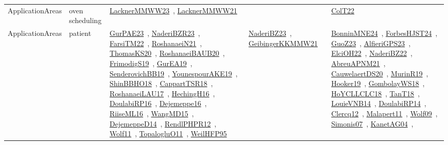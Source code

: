{\begin{longtable}{lp{3cm}>{\raggedright\arraybackslash}p{6cm}>{\raggedright\arraybackslash}p{6cm}>{\raggedright\arraybackslash}p{8cm}}
ApplicationAreas & oven scheduling & \href{../works/LacknerMMWW23.pdf}{LacknerMMWW23}~\cite{LacknerMMWW23}, \href{../works/LacknerMMWW21.pdf}{LacknerMMWW21}~\cite{LacknerMMWW21} &  & \href{../works/ColT22.pdf}{ColT22}~\cite{ColT22}\\
ApplicationAreas & patient & \href{../works/GurPAE23.pdf}{GurPAE23}~\cite{GurPAE23}, \href{../works/NaderiBZR23.pdf}{NaderiBZR23}~\cite{NaderiBZR23}, \href{../works/FarsiTM22.pdf}{FarsiTM22}~\cite{FarsiTM22}, \href{../works/RoshanaeiN21.pdf}{RoshanaeiN21}~\cite{RoshanaeiN21}, \href{../works/ThomasKS20.pdf}{ThomasKS20}~\cite{ThomasKS20}, \href{../works/RoshanaeiBAUB20.pdf}{RoshanaeiBAUB20}~\cite{RoshanaeiBAUB20}, \href{../works/FrimodigS19.pdf}{FrimodigS19}~\cite{FrimodigS19}, \href{../works/GurEA19.pdf}{GurEA19}~\cite{GurEA19}, \href{../works/SenderovichBB19.pdf}{SenderovichBB19}~\cite{SenderovichBB19}, \href{../works/YounespourAKE19.pdf}{YounespourAKE19}~\cite{YounespourAKE19}, \href{../works/ShinBBHO18.pdf}{ShinBBHO18}~\cite{ShinBBHO18}, \href{../works/CappartTSR18.pdf}{CappartTSR18}~\cite{CappartTSR18}, \href{../works/RoshanaeiLAU17.pdf}{RoshanaeiLAU17}~\cite{RoshanaeiLAU17}, \href{../works/HechingH16.pdf}{HechingH16}~\cite{HechingH16}, \href{../works/DoulabiRP16.pdf}{DoulabiRP16}~\cite{DoulabiRP16}, \href{../works/Dejemeppe16.pdf}{Dejemeppe16}~\cite{Dejemeppe16}, \href{../works/RiiseML16.pdf}{RiiseML16}~\cite{RiiseML16}, \href{../works/WangMD15.pdf}{WangMD15}~\cite{WangMD15}, \href{../works/DejemeppeD14.pdf}{DejemeppeD14}~\cite{DejemeppeD14}, \href{../works/RendlPHPR12.pdf}{RendlPHPR12}~\cite{RendlPHPR12}, \href{../works/Wolf11.pdf}{Wolf11}~\cite{Wolf11}, \href{../works/TopalogluO11.pdf}{TopalogluO11}~\cite{TopalogluO11}, \href{../works/WeilHFP95.pdf}{WeilHFP95}~\cite{WeilHFP95} & \href{../works/NaderiBZ23.pdf}{NaderiBZ23}~\cite{NaderiBZ23}, \href{../works/GeibingerKKMMW21.pdf}{GeibingerKKMMW21}~\cite{GeibingerKKMMW21} & \href{../works/BonninMNE24.pdf}{BonninMNE24}~\cite{BonninMNE24}, \href{../works/ForbesHJST24.pdf}{ForbesHJST24}~\cite{ForbesHJST24}, \href{../works/GuoZ23.pdf}{GuoZ23}~\cite{GuoZ23}, \href{../works/AlfieriGPS23.pdf}{AlfieriGPS23}~\cite{AlfieriGPS23}, \href{../works/ElciOH22.pdf}{ElciOH22}~\cite{ElciOH22}, \href{../works/NaderiBZ22.pdf}{NaderiBZ22}~\cite{NaderiBZ22}, \href{../works/AbreuAPNM21.pdf}{AbreuAPNM21}~\cite{AbreuAPNM21}, \href{../works/CauwelaertDS20.pdf}{CauwelaertDS20}~\cite{CauwelaertDS20}, \href{../works/MurinR19.pdf}{MurinR19}~\cite{MurinR19}, \href{../works/Hooker19.pdf}{Hooker19}~\cite{Hooker19}, \href{../works/GombolayWS18.pdf}{GombolayWS18}~\cite{GombolayWS18}, \href{../works/HoYCLLCLC18.pdf}{HoYCLLCLC18}~\cite{HoYCLLCLC18}, \href{../works/TanT18.pdf}{TanT18}~\cite{TanT18}, \href{../works/LouieVNB14.pdf}{LouieVNB14}~\cite{LouieVNB14}, \href{../works/DoulabiRP14.pdf}{DoulabiRP14}~\cite{DoulabiRP14}, \href{../works/Clercq12.pdf}{Clercq12}~\cite{Clercq12}, \href{../works/Malapert11.pdf}{Malapert11}~\cite{Malapert11}, \href{../works/Wolf09.pdf}{Wolf09}~\cite{Wolf09}, \href{../works/Simonis07.pdf}{Simonis07}~\cite{Simonis07}, \href{../works/KanetAG04.pdf}{KanetAG04}~\cite{KanetAG04}, 
\end{longtable}}
